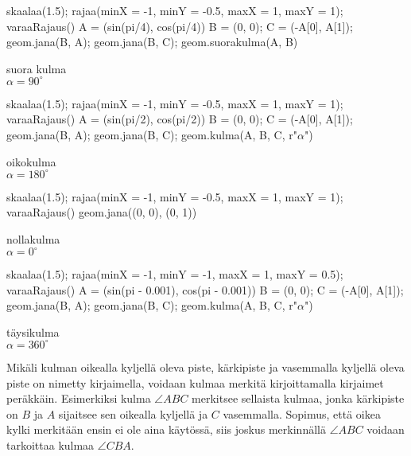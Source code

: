 \begin{minipage}{3cm}
\begin{kuva}
skaalaa(1.5); rajaa(minX = -1, minY = -0.5, maxX = 1, maxY = 1); varaaRajaus()
A = (sin(pi/4), cos(pi/4))
B = (0, 0); C = (-A[0], A[1]); geom.jana(B, A); geom.jana(B, C); geom.suorakulma(A, B)
\end{kuva}
\centering suora kulma \\$\alpha = 90^\circ$
\end{minipage}
\begin{minipage}{3cm}
\begin{kuva}
skaalaa(1.5); rajaa(minX = -1, minY = -0.5, maxX = 1, maxY = 1); varaaRajaus()
A = (sin(pi/2), cos(pi/2))
B = (0, 0); C = (-A[0], A[1]); geom.jana(B, A); geom.jana(B, C); geom.kulma(A, B, C, r"$\alpha$")
\end{kuva}
\centering oikokulma \\$\alpha = 180^\circ$
\end{minipage}
\begin{minipage}{3cm}
\begin{kuva}
skaalaa(1.5); rajaa(minX = -1, minY = -0.5, maxX = 1, maxY = 1); varaaRajaus()
geom.jana((0, 0), (0, 1))
\end{kuva}
\centering nollakulma \\$\alpha = 0^\circ$
\end{minipage}
\begin{minipage}{3cm}
\begin{kuva}
skaalaa(1.5); rajaa(minX = -1, minY = -1, maxX = 1, maxY = 0.5); varaaRajaus()
A = (sin(pi - 0.001), cos(pi - 0.001))
B = (0, 0); C = (-A[0], A[1]); geom.jana(B, A); geom.jana(B, C); geom.kulma(A, B, C, r"$\alpha$")
\end{kuva}
\centering täysikulma \\$\alpha = 360^\circ$
\end{minipage}

Mikäli kulman oikealla kyljellä oleva piste, kärkipiste ja vasemmalla kyljellä oleva piste on nimetty kirjaimella, voidaan kulmaa merkitä kirjoittamalla kirjaimet peräkkäin. Esimerkiksi kulma $\angle ABC$ merkitsee sellaista kulmaa, jonka kärkipiste on $B$ ja $A$ sijaitsee sen oikealla kyljellä ja $C$ vasemmalla. Sopimus, että oikea kylki merkitään ensin ei ole aina käytössä, siis joskus merkinnällä $\angle ABC$ voidaan tarkoittaa kulmaa $\angle CBA$.

